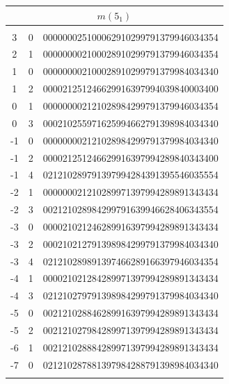 \documentclass{article}
\begin{document}
\begin{supertabular}[h]{c c r}
\hline 
{}                         \\
\hline \\[-3pt]
3     & 0  & 000000025100062910299791379946034354  \\
2     & 1  & 000000002100028910299791379946034354  \\
1     & 0  & 000000002100028910299791379984034340  \\
1     & 2  & 000021251246629916397994039840003400  \\
0     & 1  & 000000002121028984299791379946034354  \\
0     & 3  & 000210255971625994662791398984034340  \\
-1    & 0  & 000000002121028984299791379984034340  \\
-1    & 2  & 000021251246629916397994289840343400  \\
-1    & 4  & 021210289791397994284391395546035554  \\
-2    & 1  & 000000021210289971397994289891343434  \\
-2    & 3  & 002121028984299791639946628406343554  \\
-3    & 0  & 000021021246289916397994289891343434  \\
-3    & 2  & 000210212791398984299791379984034340  \\
-3    & 4  & 021210289891397466289166397946034354  \\
-4    & 1  & 000021021284289971397994289891343434  \\
-4    & 3  & 021210279791398984299791379984034340  \\
-5    & 0  & 002121028846289916397994289891343434  \\
-5    & 2  & 002121027984289971397994289891343434  \\
-6    & 1  & 002121028884289971397994289891343434  \\
-7    & 0  & 021210287881397984288791398984034340  \\
\\[-5pt]


\end{supertabular}
\end{document}
